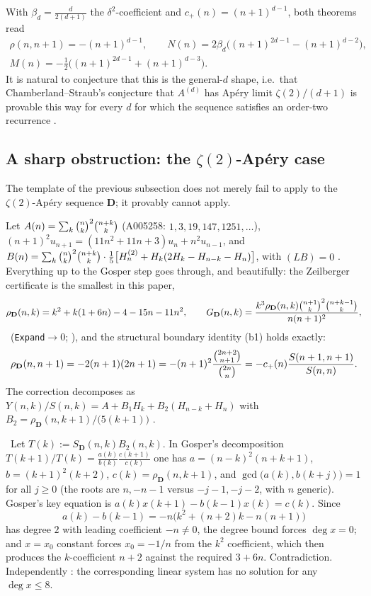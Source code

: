 \begin{observation}\label{obs:pattern}
With $\beta_d=\frac d{2(d+1)}$ the $\delta^2$-coefficient and $c_+(n)=(n+1)^{d-1}$, both
theorems read
\[
 \begin{gathered}
   \rho(n,n+1)=-(n+1)^{d-1},\qquad
   N(n)=2\beta_d\bigl((n+1)^{2d-1}-(n+1)^{d-2}\bigr),\\
   M(n)=-\tfrac12\bigl((n+1)^{2d-1}+(n+1)^{d-3}\bigr).
 \end{gathered}
\]
It is natural to conjecture that this is the general-$d$ shape, i.e.\ that
Chamberland--Straub's conjecture that $A^{(d)}$ has Ap\'ery limit $\zeta(2)/(d+1)$ is
provable this way for every $d$ for which the sequence satisfies an order-two recurrence
.
\end{observation}

\subsection{A sharp obstruction: the \texorpdfstring{$\zeta(2)$}{zeta(2)}-Ap\'ery case}
\label{ssec:obstruction}

The template of the previous subsection does not merely fail to apply to the
$\zeta(2)$-Ap\'ery sequence $\mathbf D$; it provably cannot apply.

Let $A(n)=\sum_k\binom{n}{k}^2\binom{n+k}{k}$ (A005258: $1,3,19,147,1251,\dots$),
$(n+1)^2u_{n+1}=(11n^2+11n+3)u_n+n^2u_{n-1}$, and
$B(n)=\sum_k\binom{n}{k}^2\binom{n+k}{k}\cdot\frac15\bigl[H^{(2)}_{n}+H_k(2H_k-H_{n-k}-H_n)\bigr]$, with
$(LB)=0$ . Everything up to the Gosper step goes through, and
beautifully: the Zeilberger certificate is the smallest in this paper,
\[
   \rho_{\mathbf D}(n,k)=k^2+k(1+6n)-4-15n-11n^2,
   \qquad
   G_{\mathbf D}(n,k)=\frac{k^3\rho_{\mathbf D}(n,k)\binom{n+1}{k}^2\binom{n+k-1}{k}}{n(n+1)^2},
\]
\Proved\ (\texttt{Expand}$\to0$; ), and the
structural boundary identity (b1) holds exactly:
\[
   \rho_{\mathbf D}(n,n+1)=-2(n+1)(2n+1)=-(n+1)^2\frac{\binom{2n+2}{n+1}}{\binom{2n}{n}}
   =-c_+(n)\frac{S(n+1,n+1)}{S(n,n)} .
\]
The correction decomposes as $Y(n,k)/S(n,k)=A+B_1H_k+B_2(H_{n-k}+H_n)$ with
$B_2=\rho_{\mathbf D}(n,k+1)/\bigl(5(k+1)\bigr)$ .

\begin{proposition}\label{prop:obstruction}
\Proved\ Let $T(k):=S_{\mathbf D}(n,k)B_2(n,k)$. In Gosper's decomposition
$T(k+1)/T(k)=\frac{a(k)}{b(k)}\frac{c(k+1)}{c(k)}$ one has $a=(n-k)^2(n+k+1)$,
$b=(k+1)^2(k+2)$, $c(k)=\rho_{\mathbf D}(n,k+1)$, and $\gcd\bigl(a(k),b(k+j)\bigr)=1$ for
all $j\ge0$ (the roots are $n,-n-1$ versus $-j-1,-j-2$, with $n$ generic). Gosper's key
equation is $a(k)x(k+1)-b(k-1)x(k)=c(k)$. Since
\[
   a(k)-b(k-1)=-n\bigl(k^2+(n+2)k-n(n+1)\bigr)
\]
has degree $2$ with leading coefficient $-n\ne0$, the degree bound forces $\deg x=0$; and
$x=x_0$ constant forces $x_0=-1/n$ from the $k^2$ coefficient, which then produces the
$k$-coefficient $n+2$ against the required $3+6n$. Contradiction. Independently
\Verified: the corresponding linear system has no solution for any $\deg x\le8$.
\end{proposition}

